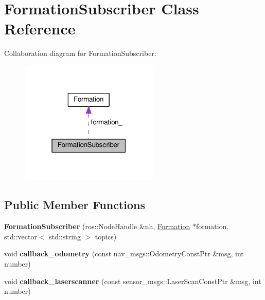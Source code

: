\hypertarget{classFormationSubscriber}{}\section{Formation\+Subscriber Class Reference}
\label{classFormationSubscriber}


Collaboration diagram for Formation\+Subscriber\+:\nopagebreak
\begin{figure}[H]
\begin{center}
\leavevmode
\includegraphics[width=187pt]{df/d1a/classFormationSubscriber__coll__graph}
\end{center}
\end{figure}
\subsection*{Public Member Functions}
\begin{DoxyCompactItemize}
\item 
{\bfseries Formation\+Subscriber} (ros\+::\+Node\+Handle \&nh, \hyperlink{classFormation}{Formation} $\ast$formation, std\+::vector$<$ std\+::string $>$ topics)\hypertarget{classFormationSubscriber_ab691695d88dd33de83c5a1a6688cc0df}{}\label{classFormationSubscriber_ab691695d88dd33de83c5a1a6688cc0df}

\item 
void {\bfseries callback\+\_\+odometry} (const nav\+\_\+msgs\+::\+Odometry\+Const\+Ptr \&msg, int number)\hypertarget{classFormationSubscriber_ad321467ea2f6538f7ee9c6fc233438d0}{}\label{classFormationSubscriber_ad321467ea2f6538f7ee9c6fc233438d0}

\item 
void {\bfseries callback\+\_\+laserscanner} (const sensor\+\_\+msgs\+::\+Laser\+Scan\+Const\+Ptr \&msg, int number)\hypertarget{classFormationSubscriber_a1eb720d4ce3016eb21cac0f33296eeae}{}\label{classFormationSubscriber_a1eb720d4ce3016eb21cac0f33296eeae}

\end{DoxyCompactItemize}
